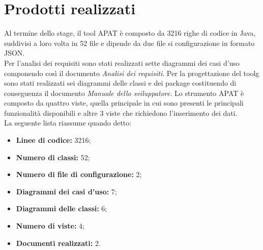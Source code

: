
\section{Prodotti realizzati}\label{sec:prodotti-ottenuti}

Al termine dello stage, il tool APAT è composto da 3216 righe di codice in Java, suddivisi a loro volta in 52 file e dipende da due file si configurazione in formato JSON.\\
Per l'analisi dei requisiti sono stati realizzati sette diagrammi dei casi d'uso componendo così il documento \textit{Analisi dei requisiti}.
Per la progettazione del toolg sono stati realizzati sei diagrammi delle classi e dei package costituendo di conseguenza il documento \textit{Manuale dello sviluppatore}.
Lo strumento APAT è composto da quattro viste, quella principale in cui sono presenti le principali funzionalità disponibili e altre 3 viste che richiedono l'inserimento dei dati.\\
La seguente lista riassume quando detto:

\begin{itemize}
    \item \textbf{Linee di codice:} 3216;
    \item \textbf{Numero di classi:} 52;
    \item \textbf{Numero di file di configurazione:} 2;
    \item \textbf{Diagrammi dei casi d'uso:} 7;
    \item \textbf{Diagrammi delle classi:} 6;
    \item \textbf{Numero di viste:} 4;
    \item \textbf{Documenti realizzati:} 2.
\end{itemize}